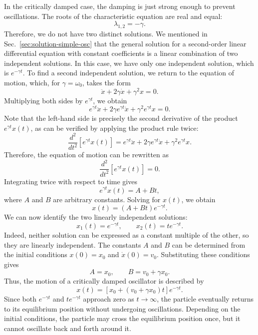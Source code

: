\documentclass[12pt]{article}
\begin{document}
In the critically damped case, the damping is just strong enough to prevent oscillations. The roots of the characteristic equation are real and equal:
\begin{equation}
    \lambda_{1,2}=-\gamma.
\end{equation}
Therefore, we do not have two distinct solutions. We mentioned in Sec.~\ref{sec:solution-simple-osc} that the general solution for a second-order linear differential equation with constant coefficients is a linear combination of two independent solutions. In this case, we have only one independent solution, which is $e^{-\gamma t}$. To find a second independent solution, we return to the equation of motion, which, for $\gamma=\omega_0$,
takes the form
\begin{equation}
    \ddot{x}+2\gamma\dot{x}+\gamma^2 x=0.
\end{equation}
Multiplying both sides by $e^{\gamma t}$, we obtain
\begin{equation}
    e^{\gamma t}\ddot{x}
    +2\gamma e^{\gamma t}\dot{x}
    +\gamma^2 e^{\gamma t}x=0.
\end{equation}
Note that the left-hand side is precisely the second derivative of the product $e^{\gamma t}x(t)$, as can be verified by applying the product rule twice:
\begin{equation}
    \frac{d^2}{dt^2}\left[e^{\gamma t}x(t)\right]
    =e^{\gamma t}\ddot{x}
    +2\gamma e^{\gamma t}\dot{x}
    +\gamma^2 e^{\gamma t}x.
\end{equation}
Therefore, the equation of motion can be rewritten as
\begin{equation}
    \frac{d^2}{dt^2}\left[e^{\gamma t}x(t)\right]=0.
\end{equation}
Integrating twice with respect to time gives
\begin{equation}
    e^{\gamma t}x(t)=A+Bt,
\end{equation}
where $A$ and $B$ are arbitrary constants. Solving for $x(t)$, we obtain
\begin{equation}
    x(t)=(A+Bt)e^{-\gamma t}.
\end{equation}
We can now identify the two linearly independent solutions:
\begin{equation}
    x_1(t)=e^{-\gamma t},
    \qquad
    x_2(t)=te^{-\gamma t}.
\end{equation}
Indeed, neither solution can be expressed as a constant multiple of the other, so they are linearly independent. The constants $A$ and $B$ can be determined from the initial conditions $x(0)=x_0$ and $\dot{x}(0)=v_0$. Substituting these conditions gives
\begin{equation}
    A=x_0,
    \qquad
    B=v_0+\gamma x_0.
\end{equation}
Thus, the motion of a critically damped oscillator is
described by
\begin{equation}
    x(t)=\left[x_0+(v_0+\gamma x_0)t\right]e^{-\gamma t}.
\end{equation}
Since both $e^{-\gamma t}$ and $te^{-\gamma t}$
approach zero as $t\to\infty$, the particle eventually
returns to its equilibrium position without undergoing
oscillations. Depending on the initial conditions, the
particle may cross the equilibrium position once, but
it cannot oscillate back and forth around it. 
\end{document}
